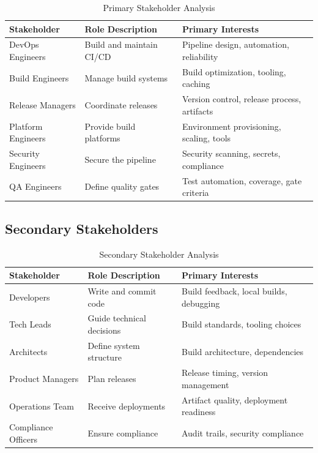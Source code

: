 \documentclass[11pt,letterpaper]{article}
\begin{document}
\begin{table}[H]
\centering
\caption{Primary Stakeholder Analysis}
\small
\begin{tabular}{@{}L{2.6cm}L{3.6cm}L{7cm}@{}}
\toprule
\textbf{Stakeholder} & \textbf{Role Description} & \textbf{Primary Interests} \\
\midrule
DevOps Engineers & Build and maintain CI/CD & Pipeline design, automation, reliability \\
\addlinespace
Build Engineers & Manage build systems & Build optimization, tooling, caching \\
\addlinespace
Release Managers & Coordinate releases & Version control, release process, artifacts \\
\addlinespace
Platform Engineers & Provide build platforms & Environment provisioning, scaling, tools \\
\addlinespace
Security Engineers & Secure the pipeline & Security scanning, secrets, compliance \\
\addlinespace
QA Engineers & Define quality gates & Test automation, coverage, gate criteria \\
\bottomrule
\end{tabular}
\end{table}

\subsection{Secondary Stakeholders}

\begin{table}[H]
\centering
\caption{Secondary Stakeholder Analysis}
\small
\begin{tabular}{@{}L{2.6cm}L{3.6cm}L{7cm}@{}}
\toprule
\textbf{Stakeholder} & \textbf{Role Description} & \textbf{Primary Interests} \\
\midrule
Developers & Write and commit code & Build feedback, local builds, debugging \\
\addlinespace
Tech Leads & Guide technical decisions & Build standards, tooling choices \\
\addlinespace
Architects & Define system structure & Build architecture, dependencies \\
\addlinespace
Product Managers & Plan releases & Release timing, version management \\
\addlinespace
Operations Team & Receive deployments & Artifact quality, deployment readiness \\
\addlinespace
Compliance Officers & Ensure compliance & Audit trails, security compliance \\
\bottomrule
\end{tabular}
\end{table}
\end{document}
